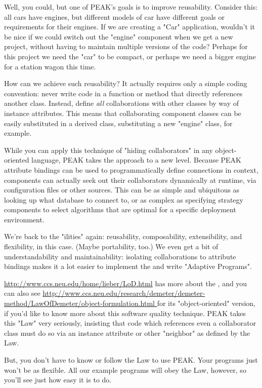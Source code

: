 Well, you could, but one of PEAK's goals is to improve reusability.  Consider
this: all cars have engines, but different models of car have different goals
or requirements for their engines.  If we are creating a "Car" application,
wouldn't it be nice if we could switch out the "engine" component when we
get a new project, without having to maintain multiple versions of the code?
Perhaps for this project we need the "car" to be compact, or perhaps we need
a bigger engine for a station wagon this time.

How can we achieve such reusability?  It actually requires only a simple
coding convention: never write code in a function or method that directly
references another class.  Instead, define \emph{all} collaborations with
other classes by way of instance attributes.  This means that collaborating
component classes can be easily substituted in a derived class, substituting
a new "engine" class, for example.






While you can apply this technique of "hiding collaborators" in any
object-oriented language, PEAK takes the approach to a new level.  Because
PEAK attribute bindings can be used to programmatically define connections in
context, components can actually seek out their collaborators dynamically at
runtime, via configuration files or other sources.  This can be as simple
and ubiquitous as looking up what database to connect to, or as complex as
specifying strategy components to select algorithms that are optimal
for a specific deployment environment.

We're back to the "ilities" again: reusability, composability, extensibility,
and flexibility, in this case.  (Maybe portability, too.)  We even get a bit
of understandability and maintainability: isolating collaborations to attribute
bindings makes it a lot easier to implement the  and 
write "Adaptive Programs". 

\begin{seealso}

\url{http://www.ccs.neu.edu/home/lieber/LoD.html} has more about the 
, and you can also see
\url{http://www.ccs.neu.edu/research/demeter/demeter-method/LawOfDemeter/object-formulation.html
} for its "object-oriented" version, if you'd like to know more about this
software quality technique.  PEAK takes this "Law" very seriously, insisting
that code which references even a collaborator class must do so via an
instance attribute or other "neighbor" as defined by the Law.

But, you don't have to know or follow the Law to use PEAK.  Your programs
just won't be as flexible.  All our example programs will obey the Law, 
however, so you'll see just how easy it is to do.

\end{seealso}

